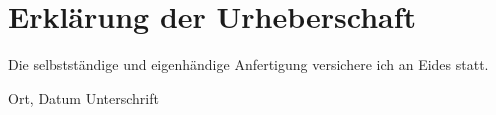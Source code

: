 \section*{Erklärung der Urheberschaft}

Die selbstständige und eigenhändige Anfertigung versichere ich an Eides statt.


\vspace{4cm}

Ort, Datum \hfill Unterschrift
\clearpage
